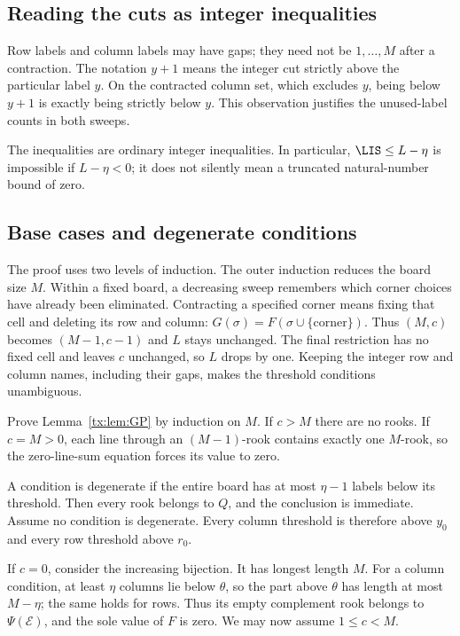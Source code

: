 \documentclass[11pt,a4paper,oneside,openany]{book}
\theoremstyle{definition}\newtheorem{definition}[theorem]{Definition}
\theoremstyle{remark}\newtheorem{remark}[theorem]{Remark}
\numberwithin{equation}{chapter}
\begin{document}
\subsection{Reading the cuts as integer inequalities}
Row labels and column labels may have gaps; they need not be
$1,\ldots,M$ after a contraction. The notation $y+1$ means the
integer cut strictly above the particular label $y$. On the contracted
column set, which excludes $y$, being below $y+1$ is exactly being
strictly below $y$. This observation justifies the unused-label
counts in both sweeps.

The inequalities are ordinary integer inequalities. In particular,
$\LIS\le L-\eta$ is impossible if $L-\eta<0$; it does not silently
mean a truncated natural-number bound of zero.

\subsection{Base cases and degenerate conditions}
The proof uses two levels of induction. The outer induction reduces
the board size $M$. Within a fixed board, a decreasing sweep remembers
which corner choices have already been eliminated. Contracting a
specified corner means fixing that cell and deleting its row and
column: $G(\sigma)=F(\sigma\cup\{\text{corner}\})$.
Thus $(M,c)$ becomes $(M-1,c-1)$ and $L$ stays unchanged. The final
restriction has no fixed cell and leaves $c$ unchanged, so $L$ drops
by one. Keeping the integer row and column names, including their
gaps, makes the threshold conditions unambiguous.

Prove Lemma~\ref{tx:lem:GP} by induction on $M$. If $c>M$ there are no rooks. If $c=M>0$, each line through an $(M-1)$-rook contains exactly one $M$-rook, so the zero-line-sum equation forces its value to zero.

A condition is degenerate if the entire board has at most $\eta-1$ labels below its threshold. Then every rook belongs to $Q$, and the conclusion is immediate. Assume no condition is degenerate. Every column threshold is therefore above $y_0$ and every row threshold above $r_0$.

If $c=0$, consider the increasing bijection. It has longest length $M$. For a column condition, at least $\eta$ columns lie below $\theta$, so the part above $\theta$ has length at most $M-\eta$; the same holds for rows. Thus its empty complement rook belongs to $\Psi(\mathcal E)$, and the sole value of $F$ is zero. We may now assume $1\le c<M$.
\end{document}
